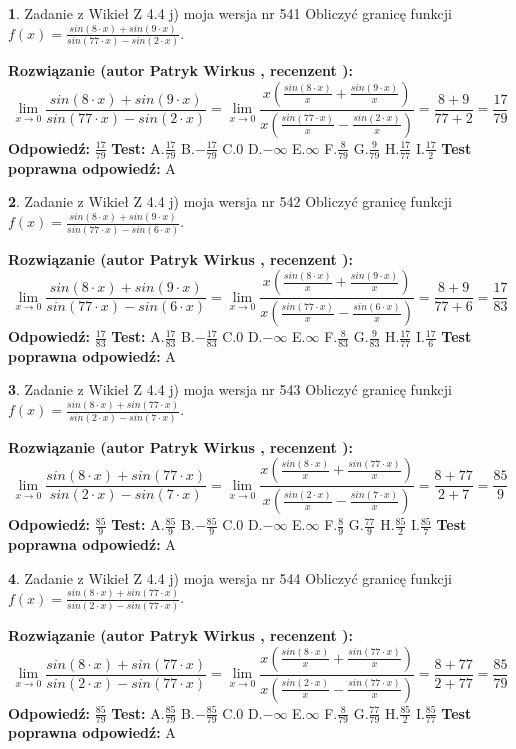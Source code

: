 \documentclass[12pt, a4paper]{article}
\theoremstyle{definition} %
\newtheorem{zad}{}
\newcommand{\zadStart}[1]{\begin{zad}#1\newline}
\newcommand{\zadStop}{\end{zad}}
\newcommand{\rozwStart}[2]{\noindent \textbf{Rozwiązanie (autor #1 , recenzent #2): }\newline}
\newcommand{\rozwStop}{\newline}
\newcommand{\odpStart}{\noindent \textbf{Odpowiedź:}\newline}
\newcommand{\odpStop}{\newline}
\newcommand{\testStart}{\noindent \textbf{Test:}\newline}
\newcommand{\testStop}{\newline}
\newcommand{\kluczStart}{\noindent \textbf{Test poprawna odpowiedź:}\newline}
\newcommand{\kluczStop}{\newline}
\begin{document}
\zadStart{Zadanie z Wikieł Z 4.4 j) moja wersja nr 541}
Obliczyć granicę funkcji $f(x)=\frac{sin(8\cdot x) +sin(9\cdot x)}{sin(77\cdot x) -sin(2\cdot x)}$.
\zadStop
\rozwStart{Patryk Wirkus}{}
$$\lim\limits_{x\to 0}\frac{sin(8\cdot x) +sin(9\cdot x)}{sin(77\cdot x) -sin(2\cdot x)}=\lim\limits_{x\to 0}\frac{x(\frac{sin(8\cdot x)}{x}+\frac{sin(9\cdot x)}{x})}{x(\frac{sin(77\cdot x)}{x}-\frac{sin(2\cdot x)}{x})}=\frac{8+9}{77+2} = \frac{17}{79}$$
\rozwStop
\odpStart
$\frac{17}{79}$
\odpStop
\testStart
A.$\frac{17}{79}$
B.$-\frac{17}{79}$
C.$0$
D.$-\infty$
E.$\infty$
F.$\frac{8}{79}$
G.$\frac{9}{79}$
H.$\frac{17}{77}$
I.$\frac{17}{2}$
\testStop
\kluczStart
A
\kluczStop



\zadStart{Zadanie z Wikieł Z 4.4 j) moja wersja nr 542}
Obliczyć granicę funkcji $f(x)=\frac{sin(8\cdot x) +sin(9\cdot x)}{sin(77\cdot x) -sin(6\cdot x)}$.
\zadStop
\rozwStart{Patryk Wirkus}{}
$$\lim\limits_{x\to 0}\frac{sin(8\cdot x) +sin(9\cdot x)}{sin(77\cdot x) -sin(6\cdot x)}=\lim\limits_{x\to 0}\frac{x(\frac{sin(8\cdot x)}{x}+\frac{sin(9\cdot x)}{x})}{x(\frac{sin(77\cdot x)}{x}-\frac{sin(6\cdot x)}{x})}=\frac{8+9}{77+6} = \frac{17}{83}$$
\rozwStop
\odpStart
$\frac{17}{83}$
\odpStop
\testStart
A.$\frac{17}{83}$
B.$-\frac{17}{83}$
C.$0$
D.$-\infty$
E.$\infty$
F.$\frac{8}{83}$
G.$\frac{9}{83}$
H.$\frac{17}{77}$
I.$\frac{17}{6}$
\testStop
\kluczStart
A
\kluczStop



\zadStart{Zadanie z Wikieł Z 4.4 j) moja wersja nr 543}
Obliczyć granicę funkcji $f(x)=\frac{sin(8\cdot x) +sin(77\cdot x)}{sin(2\cdot x) -sin(7\cdot x)}$.
\zadStop
\rozwStart{Patryk Wirkus}{}
$$\lim\limits_{x\to 0}\frac{sin(8\cdot x) +sin(77\cdot x)}{sin(2\cdot x) -sin(7\cdot x)}=\lim\limits_{x\to 0}\frac{x(\frac{sin(8\cdot x)}{x}+\frac{sin(77\cdot x)}{x})}{x(\frac{sin(2\cdot x)}{x}-\frac{sin(7\cdot x)}{x})}=\frac{8+77}{2+7} = \frac{85}{9}$$
\rozwStop
\odpStart
$\frac{85}{9}$
\odpStop
\testStart
A.$\frac{85}{9}$
B.$-\frac{85}{9}$
C.$0$
D.$-\infty$
E.$\infty$
F.$\frac{8}{9}$
G.$\frac{77}{9}$
H.$\frac{85}{2}$
I.$\frac{85}{7}$
\testStop
\kluczStart
A
\kluczStop



\zadStart{Zadanie z Wikieł Z 4.4 j) moja wersja nr 544}
Obliczyć granicę funkcji $f(x)=\frac{sin(8\cdot x) +sin(77\cdot x)}{sin(2\cdot x) -sin(77\cdot x)}$.
\zadStop
\rozwStart{Patryk Wirkus}{}
$$\lim\limits_{x\to 0}\frac{sin(8\cdot x) +sin(77\cdot x)}{sin(2\cdot x) -sin(77\cdot x)}=\lim\limits_{x\to 0}\frac{x(\frac{sin(8\cdot x)}{x}+\frac{sin(77\cdot x)}{x})}{x(\frac{sin(2\cdot x)}{x}-\frac{sin(77\cdot x)}{x})}=\frac{8+77}{2+77} = \frac{85}{79}$$
\rozwStop
\odpStart
$\frac{85}{79}$
\odpStop
\testStart
A.$\frac{85}{79}$
B.$-\frac{85}{79}$
C.$0$
D.$-\infty$
E.$\infty$
F.$\frac{8}{79}$
G.$\frac{77}{79}$
H.$\frac{85}{2}$
I.$\frac{85}{77}$
\testStop
\kluczStart
A
\kluczStop
\end{document}
